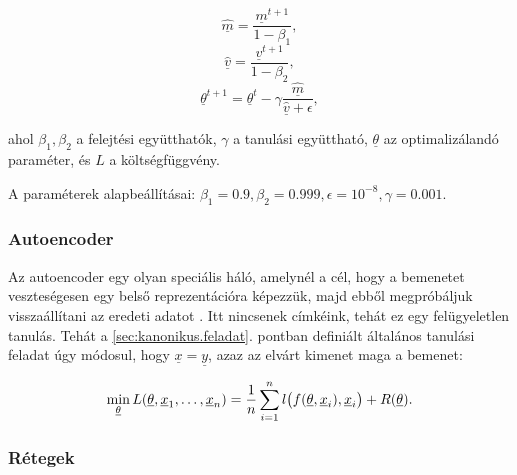 \[  \hat{\underline{m}} = \dfrac{\underline{m}^{t+1}}{1 - \beta_1} , \]
\[  \hat{\underline{v}} = \dfrac{\underline{v}^{t+1}}{1 - \beta_2}  ,\]
\[ \underline{\theta}^{t+1} = \underline{\theta}^{t} - \gamma \dfrac{\hat{\underline{m}}}{\hat{\underline{v}} + \epsilon}   ,\]

\noindent
ahol $ \beta_1, \beta_2 $ a felejtési együtthatók, $ \gamma $ a tanulási együttható,
$ \underline{\theta} $ az optimalizálandó paraméter, és $ L $ a költségfüggvény.

\noindent
A paraméterek alapbeállításai: 
$ \beta_1=0.9, \beta_2=0.999, \epsilon=10^{-8}, \gamma=0.001 .$



\subsubsection{Autoencoder}

Az autoencoder egy olyan speciális háló, amelynél a cél, hogy a bemenetet veszteségesen egy belső reprezentációra képezzük, majd ebből megpróbáljuk visszaállítani az eredeti adatot \cite{autoencoder1, autoencoder2}. Itt nincsenek címkéink, tehát ez egy felügyeletlen tanulás.
Tehát a \ref{sec:kanonikus.feladat}. pontban definiált általános tanulási feladat úgy módosul, hogy $ \underline{x} = \underline{y} $, azaz az elvárt kimenet maga a bemenet:


\[ 
\min\limits_{\underline{\theta}} L(\underline{\theta}, \underline{x}_1, \dots, \underline{x}_n) = \frac{1}{n}  \sum\limits_{{i}=1}^{n} l\big(f(\underline{\theta}, \underline{x}_i), \underline{x}_i\big) + R(\underline{\theta}) .
\]








\subsubsection{Rétegek}




